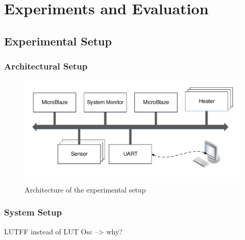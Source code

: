  
\chapter{Experiments and Evaluation}
\label{ch:experiments}

\section{Experimental Setup}
\subsection{Architectural Setup}



\begin{figure}[h]
	\includegraphics[width=\textwidth]{__pics/exsetup.pdf}
	\caption{ Architecture of the experimental setup }
	\label{pic:archsetup}	
\end{figure}

\subsection{System Setup}

LUTFF instead of LUT Osc --> why?

